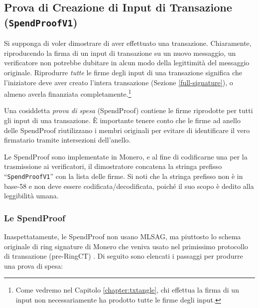 \subsection{Prova di Creazione di Input di Transazione ({\tt SpendProofV1})}
\label{subsec:proofs-input-creation-spendproof}

Si supponga di voler dimostrare di aver effettuato una transazione. Chiaramente, riproducendo la firma di un input di transazione su un nuovo messaggio, un verificatore non potrebbe dubitare in alcun modo della legittimità del messaggio originale. Riprodurre {\em tutte} le firme degli input di una transazione significa che l'iniziatore deve aver creato l’intera transazione (Sezione \ref{full-signature}), o almeno averla finanziata completamente.\footnote{Come vedremo nel Capitolo \ref{chapter:txtangle}, chi effettua la firma di un input non necessariamente ha prodotto tutte le firme degli input.}

Una cosiddetta \emph{prova di spesa} (SpendProof) contiene le firme riprodotte per tutti gli input di una transazione. È importante tenere conto che le firme ad anello delle SpendProof riutilizzano i membri originali per evitare di identificare il vero firmatario tramite intersezioni dell’anello.

Le SpendProof sono implementate in Monero, e al fine di codificarne una per la trasmissione ai verificatori, il dimostratore concatena la stringa prefisso ``{\tt SpendProofV1}'' con la lista delle firme. Si noti che la stringa prefisso non è in base-58 e non deve essere codificata/decodificata, poiché il suo scopo è dedito alla leggibilità umana.%

\subsubsection*{Le SpendProof}

Inaspettatamente, le SpendProof non usano MLSAG, ma piuttosto lo schema originale di ring signature di Monero  che veniva usato nel primissimo protocollo di transazione (pre-RingCT) \cite{cryptoNoteWhitePaper}. Di seguito sono elencati i passaggi per produrre una prova di spesa:

